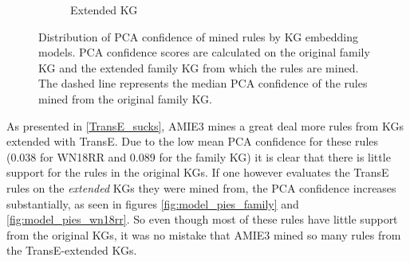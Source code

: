 \begin{figure}[h]
\begin{subfigure}{.5\textwidth}
  \caption{Extended KG}
  \label{fig:_PCA_models_family_boxplot_sub}
\end{subfigure}
\caption{Distribution of PCA confidence of mined rules by KG embedding models. PCA confidence scores are calculated on the original family KG and the extended family KG from which the rules are mined. The dashed line represents the median PCA confidence of the rules mined from the original family KG.}
\label{fig:PCA_models_family_boxplot}
\end{figure}


As presented in \cref{TransE_sucks}, AMIE3 mines a great deal more rules from KGs extended with TransE. Due to the low mean PCA confidence for these rules (0.038 for WN18RR and 0.089 for the family KG) it is clear that there is little support for the rules in the original KGs. If one however evaluates the TransE rules on the \textit{extended} KGs they were mined from, the PCA confidence increases substantially, as seen in figures \ref{fig:model_pies_family} and \ref{fig:model_pies_wn18rr}. So even though most of these rules have little support from the original KGs, it was no mistake that AMIE3 mined so many rules from the TransE-extended KGs.

